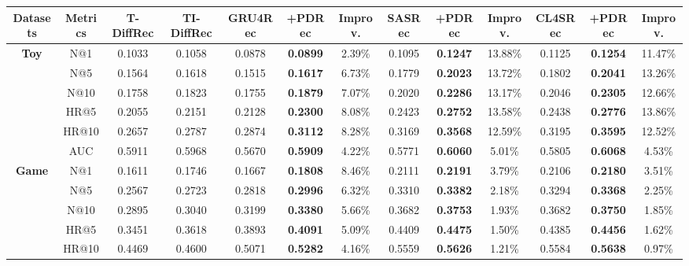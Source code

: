 \documentclass[letterpaper]{article} %
\begin{document}
% 
\begin{table}[!t]
\centering
\renewcommand\arraystretch{1.1}
\tabcolsep=1.0mm
\small
\begin{tabular}{|c|c|cc|ccc|ccc|ccc|}
\hline
\textbf{Datasets}    & \textbf{Metrics} & \textbf{T-DiffRec} & \textbf{TI-DiffRec} & \textbf{GRU4Rec} & \textbf{+PDRec} & \textbf{Improv.} & \textbf{SASRec} & \textbf{+PDRec} & \textbf{Improv.} & \textbf{CL4SRec} & \textbf{+PDRec} & \textbf{Improv.} \\ \hline
\multirow{6}{*}{\textbf{Toy}} 
    & N@1   & 0.1033 & 0.1058  & 0.0878 & \textbf{0.0899} & 2.39\% & 0.1095  & \textbf{0.1247} & 13.88\% & 0.1125  & \textbf{0.1254} & 11.47\% \\
    & N@5   & 0.1564 & 0.1618  & 0.1515 & \textbf{0.1617} & 6.73\% & 0.1779  & \textbf{0.2023} & 13.72\% & 0.1802 & \textbf{0.2041} & 13.26\% \\
    & N@10  & 0.1758 & 0.1823  & 0.1755 & \textbf{0.1879} & 7.07\% & 0.2020  & \textbf{0.2286} & 13.17\% & 0.2046 & \textbf{0.2305} & 12.66\% \\
    & HR@5  & 0.2055 & 0.2151  & 0.2128 & \textbf{0.2300} & 8.08\% & 0.2423  & \textbf{0.2752} & 13.58\% & 0.2438 & \textbf{0.2776} & 13.86\% \\
    & HR@10 & 0.2657 & 0.2787  & 0.2874 & \textbf{0.3112} & 8.28\% & 0.3169  & \textbf{0.3568} & 12.59\% & 0.3195 & \textbf{0.3595} & 12.52\% \\
    & AUC   & 0.5911 & 0.5968  & 0.5670 & \textbf{0.5909} & 4.22\% & 0.5771  & \textbf{0.6060} & 5.01\%  & 0.5805 & \textbf{0.6068} & 4.53\%  \\ \hline
\multirow{6}{*}{\textbf{Game}}  
    & N@1   & 0.1611 & 0.1746 & 0.1667 & \textbf{0.1808} & 8.46\% & 0.2111 & \textbf{0.2191} & 3.79\%  & 0.2106 & \textbf{0.2180} & 3.51\%  \\
    & N@5   & 0.2567 & 0.2723 & 0.2818 & \textbf{0.2996} & 6.32\% & 0.3310 & \textbf{0.3382} & 2.18\%  & 0.3294 & \textbf{0.3368} & 2.25\%  \\
    & N@10  & 0.2895 & 0.3040 & 0.3199 & \textbf{0.3380} & 5.66\% & 0.3682 & \textbf{0.3753} & 1.93\%  & 0.3682 & \textbf{0.3750} & 1.85\%  \\
    & HR@5  & 0.3451 & 0.3618 & 0.3893 & \textbf{0.4091} & 5.09\% & 0.4409 & \textbf{0.4475} & 1.50\%  & 0.4385 & \textbf{0.4456} & 1.62\%  \\
    & HR@10 & 0.4469 & 0.4600 & 0.5071 & \textbf{0.5282} & 4.16\% & 0.5559 & \textbf{0.5626} & 1.21\%  & 0.5584 & \textbf{0.5638} & 0.97\%  \\

\end{tabular}
\end{table}
\end{document}

